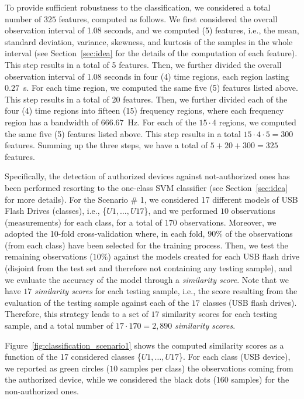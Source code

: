 \documentclass[acmsmall, authorversion]{acmart}
\begin{document}
To provide sufficient robustness to the classification, we considered a total number of $325$ features, computed as follows. We first considered the overall observation interval of 1.08 seconds, and we computed (5) features, i.e., the mean, standard deviation, variance, skewness, and kurtosis of the samples in the whole interval (see Section~\ref{sec:idea} for the details of the computation of each feature). This step results in a total of 5 features. Then, we further divided the overall observation interval of 1.08 seconds in four (4) time regions, each region lasting $0.27$~s. For each time region, we computed the same five (5) features listed above. This step results in a total of 20 features. Then, we further divided each of the four (4) time regions into fifteen (15) frequency regions, where each frequency region has a bandwidth of $666.67$~Hz. For each of the $15 \cdot 4$ regions, we computed the same five (5) features listed above. This step results in a total $15 \cdot 4 \cdot 5 = 300$ features. Summing up the three steps, we have a total of $5 + 20 + 300 = 325$ features.

Specifically, the detection of authorized devices against not-authorized ones has been performed resorting to the one-class SVM classifier (see Section~\ref{sec:idea} for more details). For the Scenario \# 1, we considered 17 different models of USB Flash Drives (classes), i.e., \{$U1, \ldots, U17$\}, and we performed $10$ observations (measurements) for each class, for a total of $170$ observations. Moreover, we adopted the 10-fold cross-validation where, in each fold, $90\%$ of the observations (from each class) have been selected for the training process. Then, we test the remaining observations ($10\%$) against the models created for each USB flash drive (disjoint from the test set and therefore not containing any testing sample), and we evaluate the accuracy of the model through a \emph{similarity score}. Note that we have $17$ \emph{similarity scores} for each testing sample, i.e., the score resulting from the evaluation of the testing sample against each of the $17$ classes (USB flash drives). Therefore, this strategy leads to a set of $17$ similarity scores for each testing sample, and a total number of $17 \cdot 170 = 2,890$ \emph{similarity scores}.

Figure~\ref{fig:classification_scenario1} shows the computed similarity scores as a function of the 17 considered classes \{$U1, \ldots, U17$\}. For each class (USB device), we reported as green circles ($10$ samples per class) the observations coming from the authorized device, while we considered the black dots ($160$ samples) for the non-authorized ones. 
\end{document}
